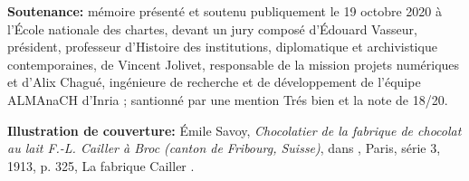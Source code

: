\bigbreak

\textbf{Soutenance:} mémoire présenté et soutenu publiquement le 19 octobre 2020 à l'École nationale des chartes, devant un jury composé d'Édouard Vasseur, président, professeur d’Histoire des institutions, diplomatique et archivistique contemporaines, de Vincent Jolivet, responsable de la mission projets numériques et d'Alix Chagué, ingénieure de recherche et de développement de l’équipe ALMAnaCH d’Inria ; santionné par une mention Trés bien et la note de 18/20.

\bigbreak

\bigbreak

\textbf{Illustration de couverture:} Émile Savoy, \textit{Chocolatier de la fabrique de chocolat au lait F.-L. Cailler à Broc (canton de Fribourg, Suisse)}, dans \lodm, Paris, série 3, 1913, p. 325, \og La fabrique Cailler \fg.